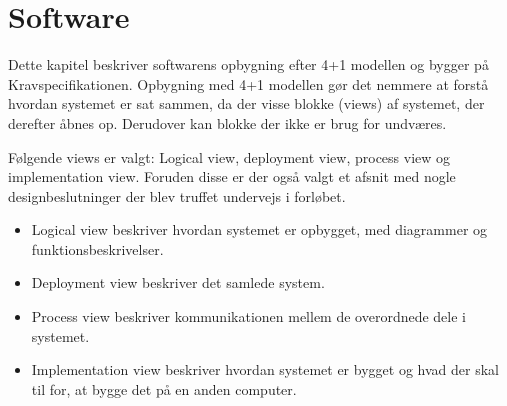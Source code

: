 \documentclass[Main]{subfiles}
\begin{document}
\chapter{Software}
Dette kapitel beskriver softwarens opbygning efter 4+1 modellen\cite[p. 872-875]{Larman} og bygger på Kravspecifikationen\cite{KravSpec}. 
Opbygning med 4+1 modellen gør det nemmere at forstå hvordan systemet er sat sammen, da der visse blokke (views) af systemet, der derefter åbnes op.
Derudover kan blokke der ikke er brug for undværes.

Følgende views er valgt:
Logical view, deployment view, process view og implementation view.
Foruden disse er der også valgt et afsnit med nogle designbeslutninger der blev truffet undervejs i forløbet.
\begin{itemize}
\item Logical view beskriver hvordan systemet er opbygget, med diagrammer og funktionsbeskrivelser.
\item Deployment view beskriver det samlede system.
\item Process view beskriver kommunikationen mellem de overordnede dele i systemet.
\item Implementation view beskriver hvordan systemet er bygget og hvad der skal til for, at bygge det på en anden computer.
\end{itemize}



\newpage


\newpage


\newpage


\newpage

\end{document}
